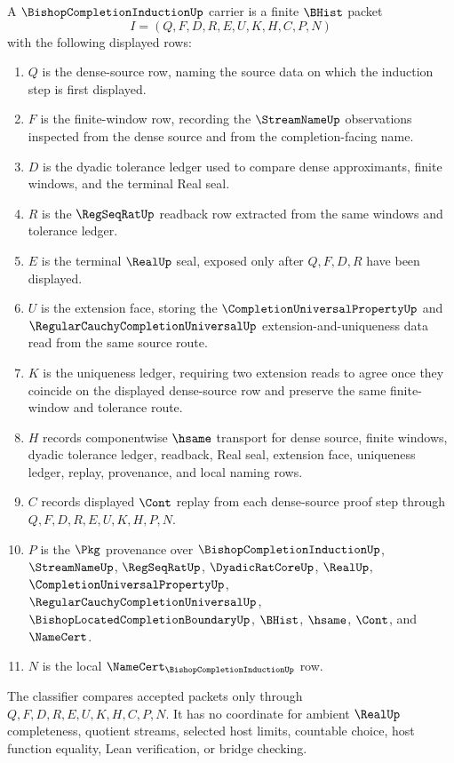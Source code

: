 \begin{definition}
\label{def:bishop-completion-induction-carrier}
A $\BishopCompletionInductionUp$ carrier is a finite $\BHist$ packet
$$
I=(Q,F,D,R,E,U,K,H,C,P,N)
$$
with the following displayed rows:
\begin{enumerate}
\item $Q$ is the dense-source row, naming the source data on which the induction step is first displayed.
\item $F$ is the finite-window row, recording the $\StreamNameUp$ observations inspected from the dense source and from the completion-facing name.
\item $D$ is the dyadic tolerance ledger used to compare dense approximants, finite windows, and the terminal Real seal.
\item $R$ is the $\RegSeqRatUp$ readback row extracted from the same windows and tolerance ledger.
\item $E$ is the terminal $\RealUp$ seal, exposed only after $Q,F,D,R$ have been displayed.
\item $U$ is the extension face, storing the $\CompletionUniversalPropertyUp$ and $\RegularCauchyCompletionUniversalUp$ extension-and-uniqueness data read from the same source route.
\item $K$ is the uniqueness ledger, requiring two extension reads to agree once they coincide on the displayed dense-source row and preserve the same finite-window and tolerance route.
\item $H$ records componentwise $\hsame$ transport for dense source, finite windows, dyadic tolerance ledger, readback, Real seal, extension face, uniqueness ledger, replay, provenance, and local naming rows.
\item $C$ records displayed $\Cont$ replay from each dense-source proof step through $Q,F,D,R,E,U,K,H,P,N$.
\item $P$ is the $\Pkg$ provenance over $\BishopCompletionInductionUp$, $\StreamNameUp$, $\RegSeqRatUp$, $\DyadicRatCoreUp$, $\RealUp$, $\CompletionUniversalPropertyUp$, $\RegularCauchyCompletionUniversalUp$, $\BishopLocatedCompletionBoundaryUp$, $\BHist$, $\hsame$, $\Cont$, and $\NameCert$.
\item $N$ is the local $\NameCert_{\BishopCompletionInductionUp}$ row.
\end{enumerate}
The classifier compares accepted packets only through $Q,F,D,R,E,U,K,H,C,P,N$. It has no coordinate for ambient $\RealUp$ completeness, quotient streams, selected host limits, countable choice, host function equality, Lean verification, or bridge checking.
\end{definition}

